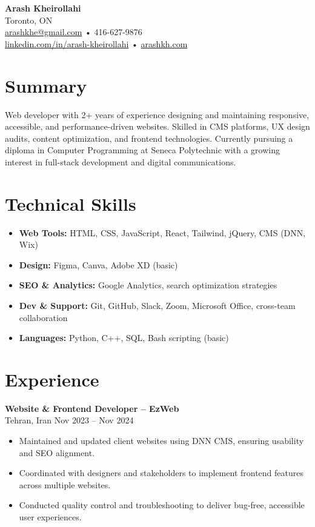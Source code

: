 \documentclass[letterpaper,11pt]{article}
\begin{document}

{\LARGE \textbf{Arash Kheirollahi}}\\[0.2em]
Toronto, ON \\
\href{mailto:arashkhe@gmail.com}{arashkhe@gmail.com} • 416-627-9876 \\
\href{https://linkedin.com/in/arash-kheirollahi}{linkedin.com/in/arash-kheirollahi} • \href{https://arashkh.com}{arashkh.com}

\vspace{0.8em}

\section*{Summary}
Web developer with 2+ years of experience designing and maintaining responsive, accessible, and performance-driven websites. Skilled in CMS platforms, UX design audits, content optimization, and frontend technologies. Currently pursuing a diploma in Computer Programming at Seneca Polytechnic with a growing interest in full-stack development and digital communications.

\section*{Technical Skills}
\begin{itemize}[leftmargin=*]
  \item \textbf{Web Tools:} HTML, CSS, JavaScript, React, Tailwind, jQuery, CMS (DNN, Wix)
  \item \textbf{Design:} Figma, Canva, Adobe XD (basic)
  \item \textbf{SEO \& Analytics:} Google Analytics, search optimization strategies
  \item \textbf{Dev \& Support:} Git, GitHub, Slack, Zoom, Microsoft Office, cross-team collaboration
  \item \textbf{Languages:} Python, C++, SQL, Bash scripting (basic)
\end{itemize}

\section*{Experience}
\textbf{Website \& Frontend Developer – EzWeb}\\
Tehran, Iran \hfill Nov 2023 -- Nov 2024
\begin{itemize}[leftmargin=*]
  \item Maintained and updated client websites using DNN CMS, ensuring usability and SEO alignment.
  \item Coordinated with designers and stakeholders to implement frontend features across multiple websites.
  \item Conducted quality control and troubleshooting to deliver bug-free, accessible user experiences.
\end{itemize}
\end{document}
